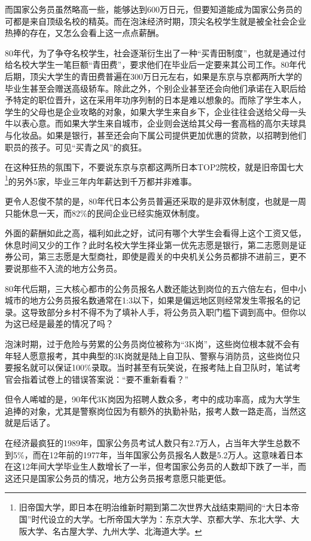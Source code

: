 而国家公务员虽然略高一些，能够达到600万日元，但要知道能成为国家公务员的可都是来自顶级名校的精英。而在泡沫经济时期，顶尖名校学生就是被全社会企业热捧的存在，又怎么会看上这一点点薪酬。

80年代，为了争夺名校学生，社会逐渐衍生出了一种“买青田制度”，也就是通过付给名校大学生一笔巨额“青田费”，要求他们在毕业后一定要来其公司工作。80年代后期，顶尖大学生的青田费普遍在300万日元左右，如果是东京与京都两所大学的毕业生甚至会赠送高级轿车。除此之外，个别企业甚至还会向他们承诺在入职后给予特定的职位晋升，这在采用年功序列制的日本是难以想象的。而除了学生本人，学生的父母也是企业攻略的对象，如果大学生来自乡下，企业往往会送给父母一头牛以表心意。而如果大学生来自城市，企业则会送给其父母一套高档的高尔夫球具与化妆品。如果是银行，甚至还会向下属公司提供更加优惠的贷款，以招聘到他们职员的孩子。可见“买青之风”的疯狂。

在这种狂热的氛围下，不要说东京与京都这两所日本TOP2院校，就是旧帝国七大\footnote{旧帝国大学，即日本在明治维新时期到第二次世界大战结束期间的“大日本帝国”时代设立的大学。七所帝国大学为：东京大学、京都大学、东北大学、大阪大学、名古屋大学、九州大学、北海道大学。}的另外5家，毕业三年内年薪达到千万都并非难事。

更令人忍俊不禁的是，80年代日本公务员普遍还采取的是非双休制度，也就是一周只能休息一天，而82\%的民间企业已经实施双休制度。

外面的薪酬如此之高，福利如此之好，试问有哪个大学生会看得上这个工资又低，休息时间又少的工作？此时名校大学生择业第一优先志愿是银行，第二志愿则是证券公司，第三志愿是大型商社，即使是霞关的中央机关公务员都排不进前三，更不要说那些不入流的地方公务员。

80年代后期，三大核心都市的公务员报名人数还能达到岗位的五六倍左右，但中小城市的地方公务员报名数通常在1:3以下，如果是偏远地区则经常发生零报名的记录。这导致部分乡村不得不为了填补人手，将公务员入职门槛下调到高中。但你以为这已经是最差的情况了吗？

泡沫时期，过于危险与劳累的公务员岗位被称为“3K岗”，这些岗位根本就不会有年轻人愿意报考，其中典型的3K岗就是陆上自卫队、警察与消防员，这些岗位只要报名就可以保证100\%录取。当时甚至有玩笑说，在报考陆上自卫队时，笔试考官会指着试卷上的错误答案说：“要不重新看看？”

但令人唏嘘的是，90年代3K岗因为招聘人数众多，考中的成功率高，成为大学生追捧的对象，尤其是警察岗位因为有额外的执勤补贴，报考人数一路走高，当然这就是后话了。

在经济最疯狂的1989年，国家公务员考试人数只有2.7万人，占当年大学生总数不到5\%，而在12年前的1977年，当年国家公务员报名人数是5.2万人。这意味着日本在这12年间大学毕业生人数增长了一半，但考国家公务员的人数却下跌了一半，而这还只是国家公务员的情况，地方公务员报考意愿只能更低。

